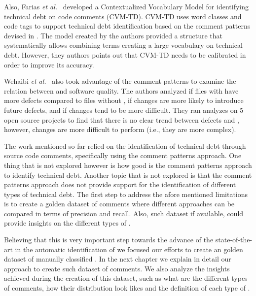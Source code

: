 Also, Farias \textit{et al.}~\cite{Farias2015MTD} developed a Contextualized Vocabulary Model for identifying technical debt on code comments (CVM-TD). CVM-TD uses word classes and code tags to support technical debt identification based on the comment patterns devised in \cite{Potdar2014ICSME}. The model created by the authors provided a structure that systematically allows combining terms creating a large vocabulary on technical debt. However, they authors points out that  CVM-TD needs to be calibrated in order to improve its accuracy. 

Wehaibi \textit{et al.}~\cite{wehaibi2016SANER} also took advantage of the comment patterns to examine the relation between \SATD and software quality. The authors analyzed if files with \SATD have more defects compared to files without \SATD, if \SATD changes are more likely to introduce future defects, and if \SATD changes tend to be more difficult. They ran analyzes on 5 open source projects to find that there is no clear trend between defects and \SATD, however, \SATD changes are more difficult to perform (i.e., they are more complex).

The work mentioned so far relied on the identification of technical debt through source code comments, specifically using the comment patterns approach. One thing that is not explored however is how good is the comment patterns approach to identify technical debt. Another topic that is not explored is that the comment patterns approach does not provide support for the identification of different types of technical debt. The first step to address the afore mentioned limitations is to create a golden dataset of \SATD comments where different approaches can be compared in terms of precision and recall. Also, such dataset if available, could provide insights on the different types of \SATD. 

Believing that this is very important step towards the advance of the state-of-the-art in the automatic identification of \SATD we focused our efforts to create an golden dataset of manually classified \SATD. In the next chapter we explain in detail our approach to create such dataset of \SATD comments. We also analyze the insights achieved during the creation of this dataset, such as what are the different types of \SATD comments, how their distribution look likes and the definition of each type of \SATD.  